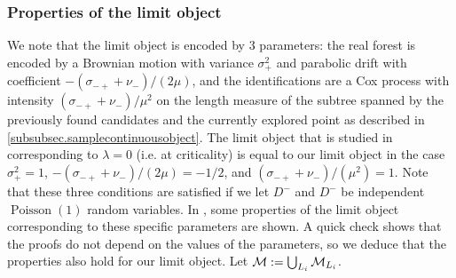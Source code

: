 \subsubsection{Properties of the limit object}
We note that the limit object is encoded by $3$ parameters: the real forest is encoded by a Brownian motion with variance $\sigma_+^2$ and parabolic drift with coefficient $-(\sigma_{-+}+\nu_-)/(2\mu)$, and the identifications are a Cox process with intensity $(\sigma_{-+}+\nu_-)/\mu^2$ on the length measure of the subtree spanned by the previously found candidates and the currently explored point as described in \ref{subsubsec.samplecontinuousobject}. The limit object that is studied in \cite{goldschmidtScalingLimitCritical2019} corresponding to $\lambda=0$ (i.e. at criticality) is equal to our limit object in the case $\sigma_+^2=1$, $-(\sigma_{-+}+\nu_-)/(2\mu)=-1/2$, and $(\sigma_{-+}+\nu_-)/(\mu^2)=1$. Note that these three conditions are satisfied if we let $D^-$ and $D^-$ be independent $\operatorname{Poisson}(1)$ random variables. In \cite{goldschmidtScalingLimitCritical2019}, some properties of the limit object corresponding to these specific parameters are shown. A quick check shows that the proofs do not depend on the values of the parameters, so we deduce that the properties also hold for our limit object. Let ${\mathcal M}:=\bigcup_{L_i}{\mathcal M}_{L_i}$.

